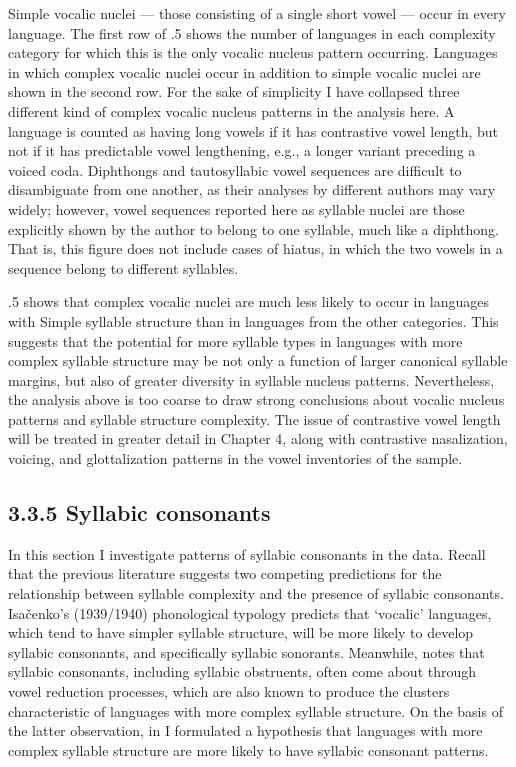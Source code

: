   Simple vocalic nuclei — those consisting of a single short vowel — occur in every language. The first row of .5 shows the number of languages in each complexity category for which this is the only vocalic nucleus pattern occurring. Languages in which complex vocalic nuclei occur in addition to simple vocalic nuclei are shown in the second row. For the sake of simplicity I have collapsed three different kind of complex vocalic nucleus patterns in the analysis here. A language is counted as having long vowels if it has contrastive vowel length, but not if it has predictable vowel lengthening, e.g., a longer variant preceding a voiced coda. Diphthongs and tautosyllabic vowel sequences are difficult to disambiguate from one another, as their analyses by different authors may vary widely; however, vowel sequences reported here as syllable nuclei are those explicitly shown by the author to belong to one syllable, much like a diphthong. That is, this figure does not include cases of hiatus, in which the two vowels in a sequence belong to different syllables.

  .5 shows that complex vocalic nuclei are much less likely to occur in languages with Simple syllable structure than in languages from the other categories. This suggests that the potential for more syllable types in languages with more complex syllable structure may be not only a function of larger canonical syllable margins, but also of greater diversity in syllable nucleus patterns. Nevertheless, the analysis above is too coarse to draw strong conclusions about vocalic nucleus patterns and syllable structure complexity. The issue of contrastive vowel length will be treated in greater detail in Chapter 4, along with contrastive nasalization, voicing, and glottalization patterns in the vowel inventories of the sample.

\subsection{3.3.5 Syllabic consonants}

  In this section I investigate patterns of syllabic consonants in the data. Recall that the previous literature suggests two competing predictions for the relationship between syllable complexity and the presence of syllabic consonants. Isačenko’s (1939/1940) phonological typology predicts that ‘vocalic’ languages, which tend to have simpler syllable structure, will be more likely to develop syllabic consonants, and specifically syllabic sonorants. Meanwhile, \citet{Bell1978a} notes that syllabic consonants, including syllabic obstruents, often come about through vowel reduction processes, which are also known to produce the clusters characteristic of languages with more complex syllable structure. On the basis of the latter observation, in  I formulated a hypothesis that languages with more complex syllable structure are more likely to have syllabic consonant patterns.

